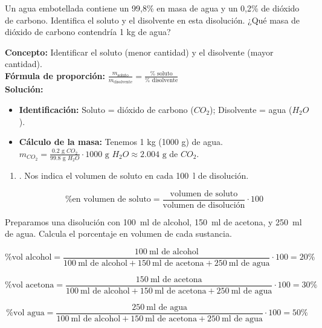 \begin{exercise}
    Un agua embotellada contiene un 99,8\% en masa de agua y un 0,2\% de dióxido de carbono. Identifica el soluto y el disolvente en esta disolución. ¿Qué masa de dióxido de carbono contendría 1 kg de agua?
    \begin{solu}
        \textbf{Concepto:} Identificar el soluto (menor cantidad) y el disolvente (mayor cantidad). \\
        \textbf{Fórmula de proporción:} $\frac{m_{\text{soluto}}}{m_{\text{disolvente}}} = \frac{\% \text{ soluto}}{\% \text{ disolvente}}$ \\
        \textbf{Solución:}
        \begin{itemize}
            \item \textbf{Identificación:} Soluto = dióxido de carbono ($CO_2$); Disolvente = agua ($H_2O$).
            \item \textbf{Cálculo de la masa:} Tenemos 1 kg (1000 g) de agua. \\
            $m_{CO_2} = \frac{0.2 \text{ g } CO_2}{99.8 \text{ g } H_2O} \cdot 1000 \text{ g } H_2O \approx 2.004 \text{ g}$ de $CO_2$.
        \end{itemize}
    \end{solu}
\end{exercise}

\begin{enumerate}[label=\numberballmDarkTeal,resume]
\item {}.
Nos indica el volumen de soluto en cada \qty{100}{\litre} de disolución.

\begin{equation}
    \text{\% en volumen de soluto} = \dfrac{\text{volumen de soluto}}{\text{volumen de disolución}}\cdot 100
\end{equation}
\end{enumerate}

\begin{example}
    Preparamos una disolución con \qty{100}{\ml} de alcohol, \qty{150}{\ml} de acetona, y \qty{250}{\ml} de agua.
    Calcula el porcentaje en volumen de cada sustancia.

    \begin{equation*}
        \text{\% vol alcohol} = \dfrac{\qty{100}{\ml}\text{ de alcohol}}{\qty{100}{\ml}\text{ de alcohol} + \qty{150}{\ml}\text{ de acetona} + \qty{250}{\ml}\text{ de agua}}\cdot 100 = 20 \%
    \end{equation*}

    \begin{equation*}
        \text{\% vol acetona} = \dfrac{\qty{150}{\ml}\text{ de acetona}}{\qty{100}{\ml}\text{ de alcohol} + \qty{150}{\ml}\text{ de acetona} + \qty{250}{\ml}\text{ de agua}}\cdot 100 = 30 \%
    \end{equation*}

    \begin{equation*}
        \text{\% vol agua} = \dfrac{\qty{250}{\ml}\text{ de agua}}{\qty{100}{\ml}\text{ de alcohol} + \qty{150}{\ml}\text{ de acetona} + \qty{250}{\ml}\text{ de agua}}\cdot 100 = 50 \%
    \end{equation*}
\end{example}

